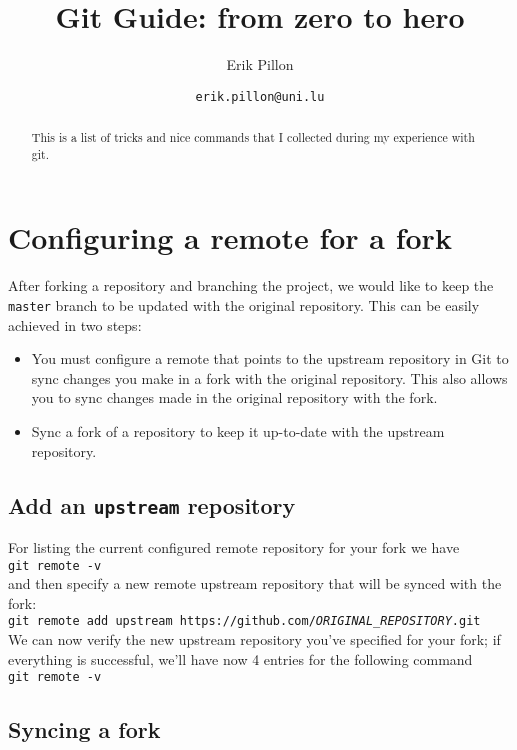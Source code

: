 \documentclass{article}
\author{Erik Pillon}
\title{Git Guide: from zero to hero}
\date{\texttt{erik.pillon@uni.lu}}
\begin{document}
\begin{abstract}
	This is a list of tricks and nice commands that I collected during my experience with git.
\end{abstract}	

\section{Configuring a remote for a fork}
After forking a repository and branching the project, we would like to keep the \texttt{master} branch to be updated with the original repository. 
This can be easily achieved in two steps: 
\begin{itemize}
	\item You must configure a remote that points to the upstream repository in Git to sync changes you make in a fork with the original repository. This also allows you to sync changes made in the original repository with the fork.
	\item Sync a fork of a repository to keep it up-to-date with the upstream repository.
\end{itemize}

\subsection{Add an \texttt{upstream} repository}
For listing the current configured remote repository for your fork we have\\ %

\texttt{git remote -v}\\ %

and then specify a new remote upstream repository that will be synced with the fork:\\

\texttt{git remote add upstream https://github.com/\textit{ORIGINAL\_REPOSITORY}.git}\\

We can now verify the new upstream repository you've specified for your fork; if everything is successful, we'll have now 4 entries for the following command\\ %

\texttt{git remote -v}
\subsection{Syncing a fork}
\end{document}

